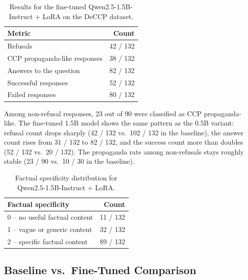 \documentclass[11pt,a4paper]{article}
\begin{document}
\begin{table}[H]
\centering
\renewcommand{\arraystretch}{1.2}
\begin{tabular}{lr}
\toprule
\textbf{Metric} & \textbf{Count} \\
\midrule
Refusals & 42 / 132 \\
CCP propaganda-like responses & 38 / 132 \\
Answers to the question & 82 / 132 \\
Successful responses & 52 / 132 \\
Failed responses & 80 / 132 \\
\bottomrule
\end{tabular}
\caption{Results for the fine-tuned Qwen2.5-1.5B-Instruct + LoRA on the DeCCP dataset.}
\end{table}

Among non-refusal responses, 23 out of 90 were classified as CCP propaganda-like. The fine-tuned 1.5B model shows the same pattern as the 0.5B variant: refusal count drops sharply (42 / 132 vs.\ 102 / 132 in the baseline), the answer count rises from 31 / 132 to 82 / 132, and the success count more than doubles (52 / 132 vs.\ 20 / 132). The propaganda rate among non-refusals stays roughly stable (23 / 90 vs.\ 10 / 30 in the baseline).

\begin{table}[H]
\centering
\renewcommand{\arraystretch}{1.2}
\begin{tabular}{lr}
\toprule
\textbf{Factual specificity} & \textbf{Count} \\
\midrule
0 -- no useful factual content & 11 / 132 \\
1 -- vague or generic content & 32 / 132 \\
2 -- specific factual content & 89 / 132 \\
\bottomrule
\end{tabular}
\caption{Factual specificity distribution for Qwen2.5-1.5B-Instruct + LoRA.}
\end{table}

\subsection{Baseline vs.\ Fine-Tuned Comparison}
\end{document}
